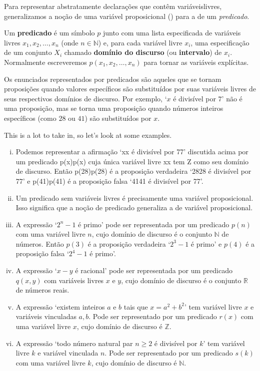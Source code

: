 Para representar abstratamente declarações que contêm variáveis ​​livres, generalizamos a noção de uma variável proposicional () para a de um \textit{predicado}.

\begin{definition}
\label{defPredicate}
Um \textbf{predicado} é um símbolo $p$ junto com uma lista especificada de variáveis ​​livres $x_1, x_2, \dots, x_n$ (onde $n \in \mathbb{N}$) e, para cada variável livre $ x_i$, uma especificação de um conjunto $X_i$ chamado \textbf{domínio do discurso} (ou \textbf{intervalo}) de $x_i$. Normalmente escreveremos $p(x_1,x_2,\dots,x_n)$ para tornar as variáveis ​​explícitas.
\end{definition}

Os enunciados representados por predicados são aqueles que se tornam proposições quando valores específicos são substituídos por suas variáveis ​​livres de seus respectivos domínios de discurso. Por exemplo, `$x$ é divisível por $7$' não é uma proposição, mas se torna uma proposição quando números inteiros específicos (como $28$ ou $41$) são substituídos por $x$.

This is a lot to take in, so let's look at some examples.

\begin{example}
\label{exFirstExamplesOfPredicates}
\fixlistskip
\begin{enumerate}[(i)]
\item Podemos representar a afirmação `xx é divisível por 77' discutida acima por um predicado p(x)p(x) cuja única variável livre xx tem Z como seu domínio de discurso. Então p(28)p(28) é a proposição verdadeira `2828 é divisível por 77' e p(41)p(41) é a proposição falsa `4141 é divisível por 77'.
\item Um predicado sem variáveis ​​livres é precisamente uma variável proposicional. Isso significa que a noção de predicado generaliza a de variável proposicional.
\item A expressão `$2^n-1$ é primo' pode ser representada por um predicado $p(n)$ com uma variável livre $n$, cujo domínio de discurso é o conjunto $\mathbb{N}$ de números. Então $p(3)$ é a proposição verdadeira `$2^3-1$ é primo' e $p(4)$ é a proposição falsa `$2^4-1$ é primo'.
\item A expressão `$x-y$ é racional' pode ser representada por um predicado $q(x,y)$ com variáveis ​​livres $x$ e $y$, cujo domínio de discurso é o conjunto $\mathbb{R}$ de números reais.
\item A expressão `existem inteiros $a$ e $b$ tais que $x = a^2+b^2$' tem variável livre $x$ e variáveis ​​vinculadas $a,b$. Pode ser representado por um predicado $r(x)$ com uma variável livre $x$, cujo domínio de discurso é $\mathbb{Z}$.
\item A expressão `todo número natural par $n \ge 2$ é divisível por $k$' tem variável livre $k$ e variável vinculada $n$. Pode ser representado por um predicado $s(k)$ com uma variável livre $k$, cujo domínio de discurso é $\mathbb{N}$.
\end{enumerate}
\end{example}



